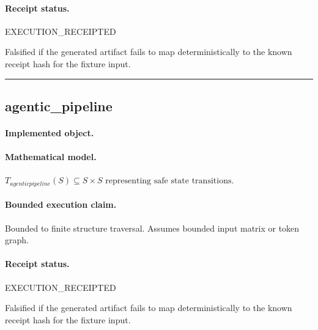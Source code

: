 \paragraph{Receipt status.} EXECUTION\_RECEIPTED
\begin{falsifier}
Falsified if the generated artifact fails to map deterministically to the known receipt hash for the fixture input.
\end{falsifier}

\vspace{1em}\hrule\vspace{1em}
\subsection{agentic\_pipeline}
\paragraph{Implemented object.} 
\paragraph{Mathematical model.} $T_{agenticpipeline}(S) \subseteq S \times S \text{ representing safe state transitions}.$
\paragraph{Bounded execution claim.} Bounded to finite structure traversal. Assumes bounded input matrix or token graph.
\paragraph{Receipt status.} EXECUTION\_RECEIPTED
\begin{falsifier}
Falsified if the generated artifact fails to map deterministically to the known receipt hash for the fixture input.
\end{falsifier}
